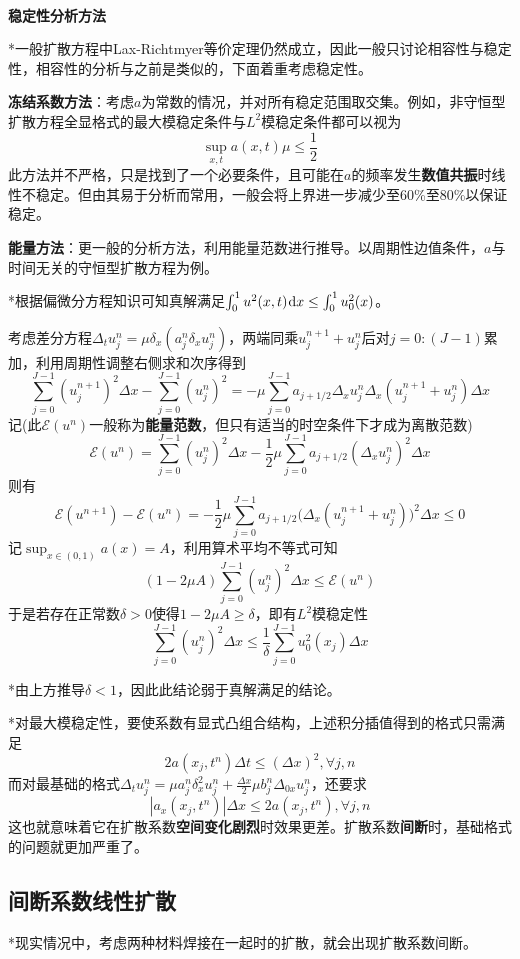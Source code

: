 \documentclass[a4paper,UTF8,fontset=windows]{ctexart}
\newcommand*{\dr}{\hspace{0.07em}\mathrm{d}}
\begin{document}
\

\textbf{稳定性分析方法}

*一般扩散方程中Lax-Richtmyer等价定理仍然成立，因此一般只讨论相容性与稳定性，相容性的分析与之前是类似的，下面着重考虑稳定性。

\textbf{冻结系数方法}：考虑$a$为常数的情况，并对所有稳定范围取交集。例如，非守恒型扩散方程全显格式的最大模稳定条件与$L^2$模稳定条件都可以视为
$$\sup_{x,t}a(x,t)\mu\le\frac{1}{2}$$
此方法并不严格，只是找到了一个必要条件，且可能在$a$的频率发生\textbf{数值共振}时线性不稳定。但由其易于分析而常用，一般会将上界进一步减少至60\%至80\%以保证稳定。

\textbf{能量方法}：更一般的分析方法，利用能量范数进行推导。以周期性边值条件，$a$与时间无关的守恒型扩散方程为例。

*根据偏微分方程知识可知真解满足$\int_0^1u^2(x,t)\dr x\le\int_0^1u_0^2(x)$。

考虑差分方程$\Delta_tu_j^n=\mu\delta_x(a_j^n\delta_xu_j^n)$，两端同乘$u_j^{n+1}+u_j^n$后对$j=0:(J-1)$累加，利用周期性调整右侧求和次序得到
$$\sum_{j=0}^{J-1}(u_j^{n+1})^2\Delta x-\sum_{j=0}^{J-1}(u_j^n)^2=-\mu\sum_{j=0}^{J-1}a_{j+1/2}\Delta_xu_j^n\Delta_x(u_j^{n+1}+u_j^n)\Delta x$$
记(此$\mathcal{E}(u^n)$一般称为\textbf{能量范数}，但只有适当的时空条件下才成为离散范数)
$$\mathcal{E}(u^n)=\sum_{j=0}^{J-1}(u_j^n)^2\Delta x-\frac{1}{2}\mu\sum_{j=0}^{J-1}a_{j+1/2}(\Delta_xu_j^n)^2\Delta x$$
则有
$$\mathcal{E}(u^{n+1})-\mathcal{E}(u^n)=-\frac{1}{2}\mu\sum_{j=0}^{J-1}a_{j+1/2}\big(\Delta_x(u_j^{n+1}+u_j^n)\big)^2\Delta x\le0$$
记$\sup_{x\in(0,1)}a(x)=A$，利用算术平均不等式可知
$$(1-2\mu A)\sum_{j=0}^{J-1}(u_j^n)^2\Delta x\le\mathcal{E}(u^n)$$
于是若存在正常数$\delta>0$使得$1-2\mu A\ge\delta$，即有$L^2$模稳定性
$$\sum_{j=0}^{J-1}(u_j^n)^2\Delta x\le\frac{1}{\delta}\sum_{j=0}^{J-1}u_0^2(x_j)\Delta x$$

*由上方推导$\delta<1$，因此此结论弱于真解满足的结论。

*对最大模稳定性，要使系数有显式凸组合结构，上述积分插值得到的格式只需满足
$$2a(x_j,t^n)\Delta t\le(\Delta x)^2,\forall j,n$$
而对最基础的格式$\Delta_tu_j^n=\mu a_j^n\delta_x^2u_j^n+\frac{\Delta x}{2}\mu b_j^n\Delta_{0x}u_j^n$，还要求
$$|a_x(x_j,t^n)|\Delta x\le2a(x_j,t^n),\forall j,n$$
这也就意味着它在扩散系数\textbf{空间变化剧烈}时效果更差。扩散系数\textbf{间断}时，基础格式的问题就更加严重了。

\subsection{间断系数线性扩散}
*现实情况中，考虑两种材料焊接在一起时的扩散，就会出现扩散系数间断。
\end{document}
